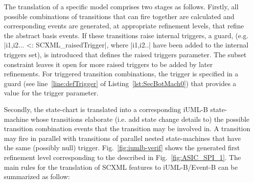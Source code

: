The translation of a specific \SCXML model comprises two stages as follows. 
Firstly, all possible combinations of transitions that can fire together are calculated and corresponding events are generated, at appropriate refinement levels, that refine the abstract basis events.  
If these transitions raise internal triggers, a guard, (e.g. |{i1,i2...} <: SCXML_raisedTrigger|, where |i1,i2..| have been added to the internal triggers set), is introduced that defines the raised triggers parameter. 
The subset constraint leaves it open for more raised triggers to be added by later refinements.
For triggered transition combinations, the trigger is specified in a guard (see line~\ref{line:defTrigger} of Listing~\ref{lst:SecBotMach0}) that provides a value for the trigger parameter. 


Secondly, the \SCXML state-chart is translated into a corresponding iUML-B state-machine whose transitions elaborate (i.e. add state change details to) the possible transition combination events that the transition may be involved in. 
A transition may fire in parallel with transitions of parallel nested state-machines that have the same (possibly null) trigger.
Fig.~\ref{fig:iumlb-verif} shows the generated \iUMLB first refinement level corresponding to the \IDS described in Fig.~\ref{fig:ASIC_SPI_1}. 
The main rules for the translation of SCXML features to iUML-B/Event-B can be summarized as follow:

